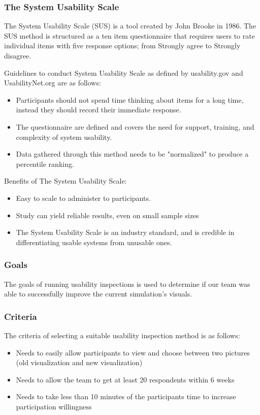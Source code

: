 \documentclass[10pt,journal,compsoc,draftclsnofoot]{IEEEtran}
\begin{document}
\subsubsection{The System Usability Scale} 
The System Usability Scale (SUS) is a tool created by John Brooke in 1986.
The SUS method is structured as a ten item questionnaire that requires users to rate individual items with five response options; from Strongly agree to Strongly disagree.

Guidelines to conduct System Usability Scale as defined by usability.gov and UsabilityNet.org are as follows:
\begin{itemize}
\item Participants should not spend time thinking about items for a long time, instead they should record their immediate response. \cite{usabilitynet}
\item The questionnaire are defined and covers the need for support, training, and complexity of system usability.
\item Data gathered through this method needs to be "normalized" to produce a percentile ranking.
\end{itemize}

Benefits of The System Usability Scale:
\begin{itemize}
\item Easy to scale to administer to participants.
\item Study can yield reliable results, even on small sample sizes
\item The System Usability Scale is an industry standard, and is credible in differentiating usable systems from unusable ones.
\end{itemize}

\subsubsection{Goals}
The goals of running usability inspections is used to determine if our team was able to successfully improve the current simulation's visuals.

\subsubsection{Criteria}
The criteria of selecting a suitable usability inspection method is as follows:
\begin{itemize}
\item Needs to easily allow participants to view and choose between two pictures (old visualization and new visualization)
\item Needs to allow the team to get at least 20 respondents within 6 weeks
\item Needs to take less than 10 minutes of the participants time to increase participation willingness
\end{itemize}
\end{document}
